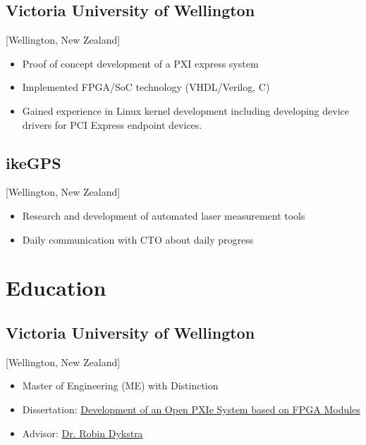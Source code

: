 \documentclass{mycv}
\begin{document}
\subsection{Victoria University of Wellington}[Wellington, New Zealand]
\begin{positions}
\end{positions}

\begin{itemize}[noitemsep]
  \item Proof of concept development of a PXI express system
  \item Implemented FPGA/SoC technology (VHDL/Verilog, C)
  \item Gained experience in Linux kernel development including developing device drivers for PCI Express endpoint devices.
\end{itemize}

\subsection{ikeGPS}[Wellington, New Zealand]
\begin{positions}
\end{positions}

\begin{itemize}[noitemsep]
  \item Research and development of automated laser measurement tools
  \item Daily communication with CTO about daily progress
\end{itemize}

\section{Education}

\subsection{Victoria University of Wellington}[Wellington, New Zealand]
\vspace{-\parskip}%
\begin{itemize}[label={}]
  \item Master of Engineering (ME) with Distinction 
  \item Dissertation: \href{https://tewaharoa.victoria.ac.nz/discovery/fulldisplay?docid=alma99178858497202386&context=L&vid=64VUW_INST:VUWNUI&search_scope=MyInst_and_CI&tab=all&lang=en}{Development of an Open PXIe System based on FPGA Modules}
  \item Advisor: \href{https://people.wgtn.ac.nz/robin.dykstra}{Dr. Robin Dykstra}
\end{itemize}
\end{document}
